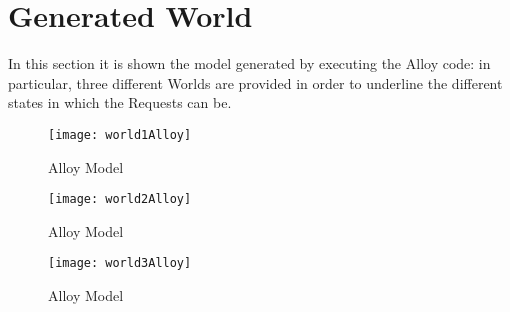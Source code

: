 \section{Generated World}
In this section it is shown the model generated by executing the Alloy code: in particular, three different Worlds are provided in order to underline the different states in which the Requests can be.
\begin{figure}[H] 
\centerline{\texttt{[image: world1Alloy]}}
\caption{Alloy Model}
\end{figure}
\begin{figure}[H] 
\centerline{\texttt{[image: world2Alloy]}}
\caption{Alloy Model}
\end{figure}
\begin{figure}[H] 
\centerline{\texttt{[image: world3Alloy]}}
\caption{Alloy Model}
\end{figure}